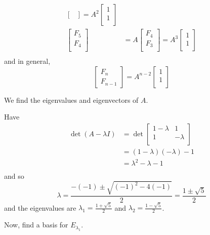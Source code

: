 \documentclass{article}
\begin{document}
\begin{example}
\begin{align*}
\begin{bmatrix}
    \end{bmatrix} = A^2
    \begin{bmatrix}
      1 \\1\\
    \end{bmatrix}      \\
    \begin{bmatrix}
      F_5 \\
      F_4 \\
    \end{bmatrix} & = A
    \begin{bmatrix}
      F_4 \\
      F_3 \\
    \end{bmatrix} = A^3
    \begin{bmatrix}
      1 \\1\\
    \end{bmatrix}      \\
  \end{align*} and in general, \[
    \begin{bmatrix}
      F_n \\F_{n-1}
    \end{bmatrix} = A^{n-2}
    \begin{bmatrix}
      1 \\1\\
    \end{bmatrix}
  \]

  We find the eigenvalues and eigenvectors of $A$.

  Have
  \begin{align*}
    \det (A - \lambda I) & = \det
    \begin{bmatrix}
      1 - \lambda & 1        \\
      1           & -\lambda \\
    \end{bmatrix}                             \\
                         & = (1-\lambda)(-\lambda) - 1 \\
                         & = \lambda^2 - \lambda - 1   \\
  \end{align*} and so \[
    \lambda = \frac{-(-1) \pm \sqrt{(-1)^2 -4(-1)}}{2} = \frac{1 \pm \sqrt{5}}{2}
  \] and the eigenvalues are $\lambda_1 = \frac{1 + \sqrt{5}}{2}$ and $\lambda_2 = \frac{1 - \sqrt{5}}{2}$.

  Now, find a basis for $E_{\lambda_1}$.


\end{example}
\end{document}
